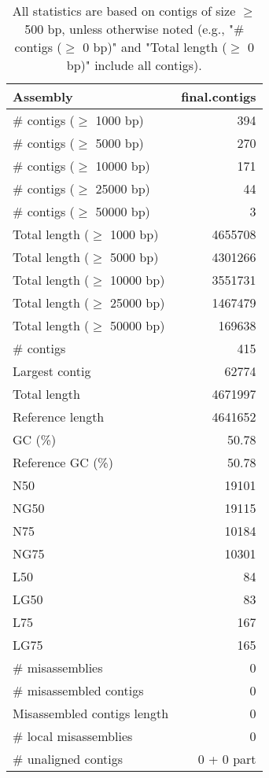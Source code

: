 \documentclass[12pt,a4paper]{article}
\begin{document}
\begin{table}[ht]
\begin{center}
\caption{All statistics are based on contigs of size $\geq$ 500 bp, unless otherwise noted (e.g., "\# contigs ($\geq$ 0 bp)" and "Total length ($\geq$ 0 bp)" include all contigs).}
\begin{tabular}{|l*{1}{|r}|}
\hline
Assembly & final.contigs \\ \hline
\# contigs ($\geq$ 1000 bp) & 394 \\ \hline
\# contigs ($\geq$ 5000 bp) & 270 \\ \hline
\# contigs ($\geq$ 10000 bp) & 171 \\ \hline
\# contigs ($\geq$ 25000 bp) & 44 \\ \hline
\# contigs ($\geq$ 50000 bp) & 3 \\ \hline
Total length ($\geq$ 1000 bp) & 4655708 \\ \hline
Total length ($\geq$ 5000 bp) & 4301266 \\ \hline
Total length ($\geq$ 10000 bp) & 3551731 \\ \hline
Total length ($\geq$ 25000 bp) & 1467479 \\ \hline
Total length ($\geq$ 50000 bp) & 169638 \\ \hline
\# contigs & 415 \\ \hline
Largest contig & 62774 \\ \hline
Total length & 4671997 \\ \hline
Reference length & 4641652 \\ \hline
GC (\%) & 50.78 \\ \hline
Reference GC (\%) & 50.78 \\ \hline
N50 & 19101 \\ \hline
NG50 & 19115 \\ \hline
N75 & 10184 \\ \hline
NG75 & 10301 \\ \hline
L50 & 84 \\ \hline
LG50 & 83 \\ \hline
L75 & 167 \\ \hline
LG75 & 165 \\ \hline
\# misassemblies & 0 \\ \hline
\# misassembled contigs & 0 \\ \hline
Misassembled contigs length & 0 \\ \hline
\# local misassemblies & 0 \\ \hline
\# unaligned contigs & 0 + 0 part \\ \hline

\end{tabular}
\end{center}
\end{table}
\end{document}

